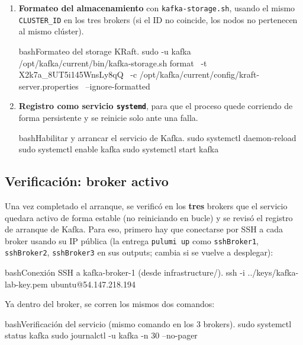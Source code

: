 \begin{enumerate}
\begin{sourcecode}[\label{codigo-server-properties}]{plaintext}{server.properties generado para kafka-broker-1 (node.id=1).}
log.dirs=/var/lib/kafka/data
num.partitions=3
default.replication.factor=3
			\end{sourcecode}

			\item \textbf{Formateo del almacenamiento} con \texttt{kafka-storage.sh}, usando el mismo \texttt{CLUSTER\_ID} en los tres brokers (si el ID no coincide, los nodos no pertenecen al mismo clúster).

			\begin{sourcecode}[\label{codigo-storage-format}]{bash}{Formateo del storage KRaft.}
sudo -u kafka /opt/kafka/current/bin/kafka-storage.sh format \
    -t X2k7a_8UT5i145WnsLy8qQ \
    -c /opt/kafka/current/config/kraft-server.properties \
    --ignore-formatted
			\end{sourcecode}

			\item \textbf{Registro como servicio \texttt{systemd}}, para que el proceso quede corriendo de forma persistente y se reinicie solo ante una falla.

			\begin{sourcecode}[\label{codigo-systemd}]{bash}{Habilitar y arrancar el servicio de Kafka.}
sudo systemctl daemon-reload
sudo systemctl enable kafka
sudo systemctl start kafka
			\end{sourcecode}
		\end{enumerate}

	\subsection{Verificación: broker activo}

		Una vez completado el arranque, se verificó en los \textbf{tres} brokers que el servicio quedara activo de forma estable (no reiniciando en bucle) y se revisó el registro de arranque de Kafka. Para eso, primero hay que conectarse por SSH a cada broker usando su IP pública (la entrega \texttt{pulumi up} como \texttt{sshBroker1}, \texttt{sshBroker2}, \texttt{sshBroker3} en sus outputs; cambia si se vuelve a desplegar):

		\begin{sourcecode}[\label{codigo-ssh-broker1}]{bash}{Conexión SSH a kafka-broker-1 (desde infrastructure/).}
ssh -i ../keys/kafka-lab-key.pem ubuntu@54.147.218.194
		\end{sourcecode}

		Ya dentro del broker, se corren los mismos dos comandos:

		\begin{sourcecode}[\label{codigo-check-status}]{bash}{Verificación del servicio (mismo comando en los 3 brokers).}
sudo systemctl status kafka
sudo journalctl -u kafka -n 30 --no-pager
		\end{sourcecode}

